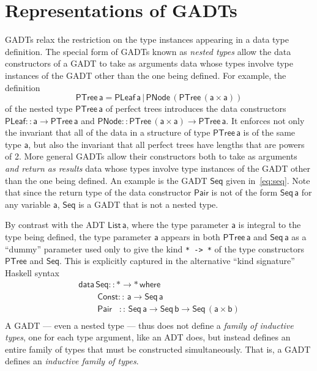 \documentclass[acmsmall,screen,review,anonymous]{acmart}
\theoremstyle{definition}
\begin{document}
\section{Representations of GADTs}\label{sec:gadts}

GADTs relax the restriction on the type instances appearing in a data
type definition. The special form of GADTs known as {\em nested types}
allow the data constructors of a GADT to take as arguments data whose
types involve type instances of the GADT other than the one being
defined. For example, the definition
\[\mathsf{PTree \, a = PLeaf \,a \,|\, PNode \,(PTree\,(a \times
  a))}\] of the nested type $\mathsf{PTree\,a}$ of perfect trees
introduces the data constructors $\mathsf{PLeaf :: a \to PTree\,a}$
and $\mathsf{PNode :: PTree \,(a\times a) \to PTree\,a}$. It enforces
not only the invariant that all of the data in a structure of type
$\mathsf{PTree\,a}$ is of the same type $\mathsf{a}$, but also the
invariant that all perfect trees have lengths that are powers of
2. More general GADTs allow their constructors both to take as
arguments {\em and return as results} data whose types involve type
instances of the GADT other than the one being defined. An example is
the GADT $\mathsf{Seq}$ given in~\eqref{eq:seq}. Note that since the
return type of the data constructor $\mathsf{Pair}$ is not of the form
$\mathsf{Seq\,a}$ for any variable $\mathsf{a}$, $\mathsf{Seq}$ is a
GADT that is not a nested type.

By contrast with the ADT $\mathsf{List\, a}$, where the type parameter
$\mathsf{a}$ is integral to the type being defined, the type parameter
$\mathsf{a}$ appears in both $\mathsf{PTree\,a}$ and $\mathsf{Seq\,a}$
as a ``dummy'' parameter used only to give the kind \verb|* -> *| of
the type constructors $\mathsf{PTree}$ and $\mathsf{Seq}$. This is
explicitly captured in the alternative ``kind signature'' Haskell
syntax
\[\begin{array}{l}
\mathsf{data\, Seq :: * \to *\,where}\\
\mathsf{\;\;\;\;\;\;\;\;Const ::\, a \to Seq\,a}\\
\mathsf{\;\;\;\;\;\;\;\;Pair\,\,\,\,\, ::\, Seq \,a \to Seq\,b \to
  Seq\,(a \times b)}\\ 
\end{array}\]
A GADT --- even a nested type --- thus does not define a {\em family
  of inductive types}, one for each type argument, like an ADT does,
but instead defines an entire family of types that must be constructed
simultaneously. That is, a GADT defines an {\em inductive family of
  types}.
\end{document}
